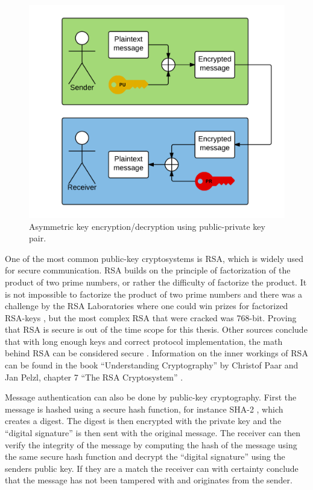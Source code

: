 \begin{figure}[h!]
  \captionsetup{justification=centering,margin=1.5cm}
  \caption{Asymmetric key encryption/decryption using public-private key pair.}
  \label{fig:encrypt_basic}
  \centering
    \includegraphics[width=1\textwidth]{images/encrypt_basic.png}
\end{figure}

One of the most common public-key cryptosystems is RSA, which is widely used for secure communication. RSA builds on the principle of factorization of the product of two prime numbers, or rather the difficulty of factorize the product. It is not impossible to factorize the product of two prime numbers and there was a challenge by the RSA Laboratories where one could win prizes for factorized RSA-keys \cite{rsaChallenge}, but the most complex RSA that were cracked was 768-bit. Proving that RSA is secure is out of the time scope for this thesis. Other sources conclude that with long enough keys and correct protocol implementation, the math behind RSA can be considered secure \cite[~p. 194]{cryptoMath}. Information on the inner workings of RSA can be found in the book ``Understanding Cryptography'' by Christof Paar and Jan Pelzl, chapter 7 ``The RSA Cryptosystem'' \cite{cryptoMath}.

Message authentication can also be done by public-key cryptography. First the message is hashed using a secure hash function, for instance SHA-2 \cite{shaRFC}, which creates a digest. The digest is then encrypted with the private key and the ``digital signature'' is then sent with the original message. The receiver can then verify the integrity of the message by computing the hash of the message using the same secure hash function and decrypt the ``digital signature'' using the senders public key. If they are a match the receiver can with certainty conclude that the message has not been tampered with and originates from the sender.

